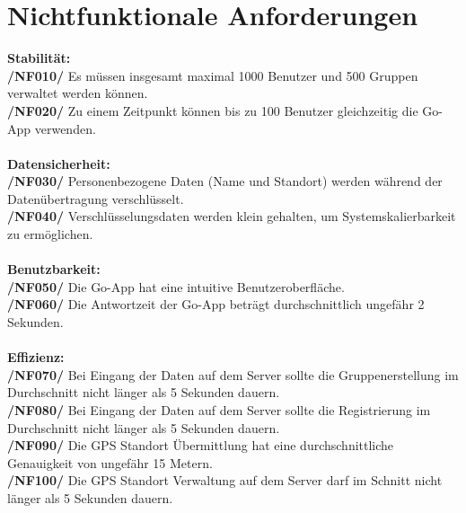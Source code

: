 \section{Nichtfunktionale Anforderungen}
  
\textbf{Stabilität:}\\
\textbf{/NF010/} Es müssen insgesamt maximal 1000 Benutzer und 500 Gruppen verwaltet werden können. \\
\textbf{/NF020/} Zu einem Zeitpunkt können bis zu 100 Benutzer gleichzeitig die Go-App verwenden. \\ \\
\textbf{Datensicherheit:}\\
\textbf{/NF030/} Personenbezogene Daten (Name und Standort) werden während der Datenübertragung verschlüsselt.\\
\textbf{/NF040/} Verschlüsselungsdaten werden klein gehalten, um Systemskalierbarkeit zu ermöglichen.\\ \\
\textbf{Benutzbarkeit:}\\
\textbf{/NF050/} Die Go-App hat eine intuitive Benutzeroberfläche.\\
\textbf{/NF060/} Die Antwortzeit der Go-App beträgt durchschnittlich ungefähr 2 Sekunden.\\ \\
\textbf{Effizienz:}\\
\textbf{/NF070/} Bei Eingang der Daten auf dem Server sollte die Gruppenerstellung im Durchschnitt nicht länger als 5 Sekunden dauern.\\
\textbf{/NF080/} Bei Eingang der Daten auf dem Server sollte die Registrierung im Durchschnitt nicht länger als 5 Sekunden dauern.\\
\textbf{/NF090/} Die GPS Standort Übermittlung hat eine durchschnittliche Genauigkeit von ungefähr 15 Metern.\\
\textbf{/NF100/} Die GPS Standort Verwaltung auf dem Server darf im Schnitt nicht länger als 5 Sekunden dauern.\\
